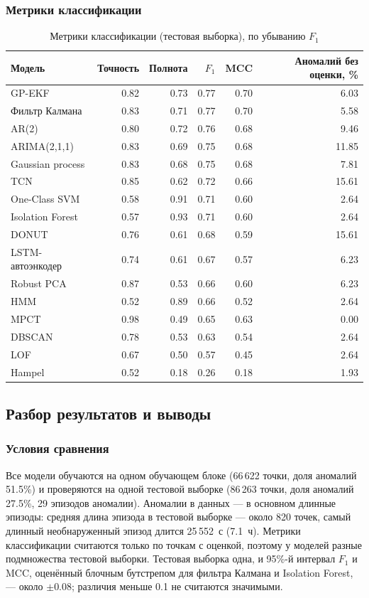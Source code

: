 \documentclass[a4paper,12pt]{report}
\begin{document}
\subsubsection{Метрики классификации}
\begin{table}[H]
\centering
\small
\caption{Метрики классификации (тестовая выборка), по убыванию $F_1$}
\begin{tabular}{lrrrrr}
\toprule
Модель & Точность & Полнота & $F_1$ & MCC & Аномалий без оценки, \% \\
\midrule
GP-EKF & 0.82 & 0.73 & 0.77 & 0.70 & 6.03 \\
Фильтр Калмана & 0.83 & 0.71 & 0.77 & 0.70 & 5.58 \\
AR(2) & 0.80 & 0.72 & 0.76 & 0.68 & 9.46 \\
ARIMA(2,1,1) & 0.83 & 0.69 & 0.75 & 0.68 & 11.85 \\
Gaussian process & 0.83 & 0.68 & 0.75 & 0.68 & 7.81 \\
TCN & 0.85 & 0.62 & 0.72 & 0.66 & 15.61 \\
One-Class SVM & 0.58 & 0.91 & 0.71 & 0.60 & 2.64 \\
Isolation Forest & 0.57 & 0.93 & 0.71 & 0.60 & 2.64 \\
DONUT & 0.76 & 0.61 & 0.68 & 0.59 & 15.61 \\
LSTM-автоэнкодер & 0.74 & 0.61 & 0.67 & 0.57 & 6.23 \\
Robust PCA & 0.87 & 0.53 & 0.66 & 0.60 & 6.23 \\
HMM & 0.52 & 0.89 & 0.66 & 0.52 & 2.64 \\
MPCT & 0.98 & 0.49 & 0.65 & 0.63 & 0.00 \\
DBSCAN & 0.78 & 0.53 & 0.63 & 0.54 & 2.64 \\
LOF & 0.67 & 0.50 & 0.57 & 0.45 & 2.64 \\
Hampel & 0.52 & 0.18 & 0.26 & 0.18 & 1.93 \\
\bottomrule
\end{tabular}
\end{table}

\subsection{Разбор результатов и выводы}

\subsubsection{Условия сравнения}

Все модели обучаются на одном обучающем блоке (66\,622 точки, доля аномалий 51.5\%) и проверяются на одной тестовой выборке (86\,263 точки, доля аномалий 27.5\%, 29 эпизодов аномалии). Аномалии в данных --- в основном длинные эпизоды: средняя длина эпизода в тестовой выборке --- около 820 точек, самый длинный необнаруженный эпизод длится 25\,552~с (7.1~ч). Метрики классификации считаются только по точкам с оценкой, поэтому у моделей разные подмножества тестовой выборки. Тестовая выборка одна, и 95\%-й интервал $F_1$ и MCC, оценённый блочным бутстрепом для фильтра Калмана и Isolation Forest, --- около $\pm0.08$; различия меньше 0.1 не считаются значимыми.
\end{document}
